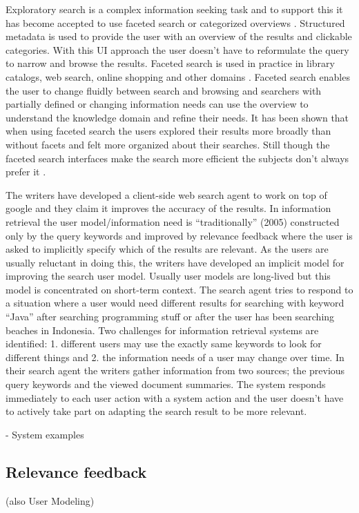 \documentclass{sigchi}
\begin{document}
Exploratory search is a complex information seeking task and to support this it has become accepted to use faceted search or categorized overviews \cite{kules09}. Structured metadata is used to provide the user with an overview of the results and clickable categories. With this UI approach the user doesn't have to reformulate the query to narrow and browse the results. Faceted search is used in practice in library catalogs, web search, online shopping and other domains \cite{kules09}. Faceted search enables the user to change fluidly between search and browsing and searchers with partially defined or changing information needs can use the overview to understand the knowledge domain and refine their needs. It has been shown that when using faceted search the users explored their results more broadly than without facets and felt more organized about their searches. Still though the faceted search interfaces make the search more efficient the subjects don't always prefer it \cite{kules09}. 

\cite{shen05}The writers have developed a client-side web search agent to work on top of google and they claim it improves the accuracy of the results. In information retrieval the user model/information need is “traditionally” (2005) constructed only by the query keywords and improved by relevance feedback where the user is asked to implicitly specify which of the results are relevant. As the users are usually reluctant in doing this, the writers have developed an implicit model for improving the search user model. Usually user models are long-lived but this model is concentrated on short-term context. The search agent tries to respond to a situation where a user would need different results for searching with keyword “Java” after searching programming stuff or after the user has been searching beaches in Indonesia. Two challenges for information retrieval systems are identified: 1. different users may use the exactly same keywords to look for different things and 2. the information needs of a user may change over time. In their search agent the writers gather information from two sources; the previous query keywords and the viewed document summaries. The system responds immediately to each user action with a system action and the user doesn’t have to actively take part on adapting the search result to be more relevant.

- System examples
\subsection{Relevance feedback}
(also User Modeling) 
\end{document}
